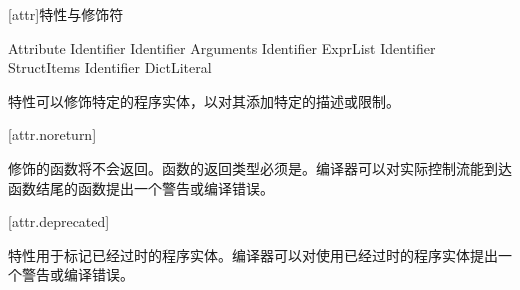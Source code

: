 
[attr]{特性与修饰符}

\begin{bnf}{Attribute}
     Identifier \br
     Identifier \terminal{(} Arguments\bnfq \terminal{)} \br
     Identifier \terminal{[} ExprList\bnfq \terminal{]} \br
     Identifier \terminal{\{} StructItems\bnfq \terminal{\}} \br
     Identifier DictLiteral
\end{bnf}

\pnum
特性可以修饰特定的程序实体，以对其添加特定的描述或限制。

[attr.noreturn]{}

\pnum
{}修饰的函数将不会返回。函数的返回类型必须是。编译器可以对实际控制流能到达函数结尾的函数提出一个警告或编译错误。

[attr.deprecated]{}

\pnum
{}特性用于标记已经过时的程序实体。编译器可以对使用已经过时的程序实体提出一个警告或编译错误。